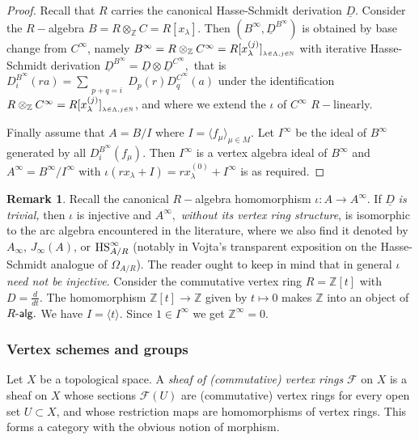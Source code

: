 \documentclass{article}
\theoremstyle{definition}
\newtheorem{rem}[thm]{Remark}
\def\Ralg{\ensuremath{R\text{-\textup{\textsf{alg}}}}}
\def\Z{\ensuremath{\mathbb Z}}
\def\uD{\ensuremath{\underline{D}}}
\begin{document}
{\begin{proof}
Recall that $R$ carries the canonical Hasse-Schmidt derivation $\uD$. Consider the $R-$algebra $B = R \otimes_\Z C = R[x_\lambda].$ Then $(B^\infty, \uD^{B^\infty})$ is obtained by base change from $C^\infty$, namely 
	$B^\infty = R \otimes_\Z C^\infty = R[x_\lambda^{(j)}]_{_{\lambda \in \Lambda, j \in \Bbb{N}}}$ with iterative Hasse-Schmidt derivation $\underline{D}^{B^\infty} = \underline{D} \otimes \underline{D}^{C^\infty},$ that is ${D}^{B^\infty}_i (ra) =  \sum_{\substack{ \\ p+q = i}}D_p(r)D^{C^\infty}_q(a)$ under the identification $R \otimes_\Z C^\infty = R[x_\lambda^{(j)}]_{_{\lambda \in \Lambda, j \in \Bbb{N}}}$, and where we extend the $\iota$ of $C^\infty$ $R-$linearly. 

Finally assume that $A = B/I$ where $I = \langle f_\mu \rangle_{\mu \in M}.$ Let $I^\infty$ be the ideal of $B^\infty$ generated by all ${D}^{B^\infty}_i(f_\mu).$ Then $I^\infty$ is a vertex algebra ideal of $B^\infty$ and $A^\infty = B^\infty/I^\infty$ with $\iota (rx_\lambda + I) =  rx^{(0)}_\lambda + I^\infty$ is as required.     \end{proof}




 \begin{rem} \label{remarc} Recall the canonical $R-$algebra homomorphism $\iota \colon A \to A^\infty.$ If $\underline{D}$ {\it is trivial,} then $\iota$ is injective and $A^\infty,$ {\it without its vertex ring structure},  is isomorphic to the arc algebra encountered in the literature, where we also find it denoted by $A_\infty$, $J_\infty(A)$, or ${\rm HS}^\infty_{A/R}$ (notably in Vojta's transparent exposition \cite{Voj} on the Hasse-Schmidt analogue of $\Omega_{A/R}$).
	The reader ought to keep in mind that in general $\iota$  {\it need not be injective}. Consider the commutative vertex ring $R = \Z[t]$ with $D = \frac{d}{dt}.$ The homomorphism $\Z[t] \to \Z$  given by $t \mapsto 0$ makes $\Z$ into an object of $\Ralg.$ We have $I = \langle t \rangle.$ Since $1 \in I^\infty$ we get $\Z^\infty = 0.$ 
\end{rem}

\subsubsection{Vertex  schemes and groups}\label{avs}

Let $X$ be a topological space. A \emph{sheaf of (commutative) vertex rings} $\mathcal F$ on $X$ is a sheaf on $X$ whose sections $\mathcal F(U)$ are (commutative) vertex rings for every open set $U \subset X$, and whose restriction maps are homomorphisms of vertex rings. 
This forms a category with the obvious notion of morphism.

}
\end{document}
